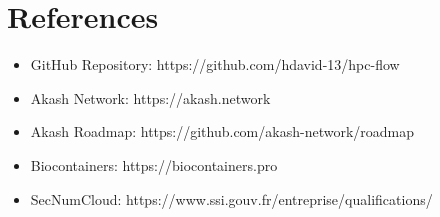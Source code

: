 \documentclass[11pt,a4paper]{article}
\begin{document}
	\section{References}
	
	\begin{itemize}
		\item GitHub Repository: https://github.com/hdavid-13/hpc-flow
		\item Akash Network: https://akash.network
		\item Akash Roadmap: https://github.com/akash-network/roadmap
		\item Biocontainers: https://biocontainers.pro
		\item SecNumCloud: https://www.ssi.gouv.fr/entreprise/qualifications/
	\end{itemize}
	
\end{document}
